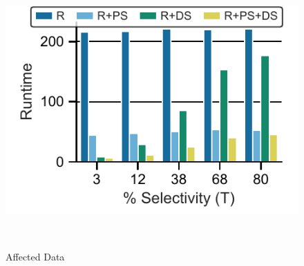 \begin{figure}[t]
\begin{minipage}[b]{0.235\linewidth}
               \end{minipage}
               \begin{minipage}[b]{0.225\linewidth}
               \includegraphics[width=1\linewidth,trim=0              0 0                                     0,                             clip]{imgs/felix_affected_data.pdf}      \\
               \vspace{-8mm}
               \caption{Affected                                      Data}
               \label{fig:Affected                                    Data}
               \end{minipage}                                         \\
\end{figure}

